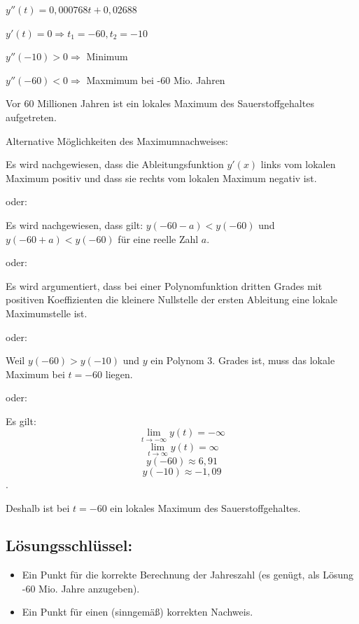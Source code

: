\begin{langesbeispiel}
{\begin{enumerate}
			$y''(t)=0,000768t+0,02688$\leer
			
			$y'(t)=0 \Rightarrow t_1=-60, t_2=-10$
			
			$y''(-10)>0 \Rightarrow$ Minimum
			
			$y''(-60)<0 \Rightarrow$ Maxmimum bei -60 Mio. Jahren
			
			Vor 60 Millionen Jahren ist ein lokales Maximum des Sauerstoffgehaltes aufgetreten.\leer
			
			Alternative Möglichkeiten des Maximumnachweises:\leer
			
			Es wird nachgewiesen, dass die Ableitungsfunktion $y'(x)$ links vom lokalen Maximum positiv und dass sie rechts vom lokalen Maximum negativ ist.\leer
			
			oder:\leer
			
			Es wird nachgewiesen, dass gilt: $y(-60-a)<y(-60)$ und $y(-60+a)<y(-60)$ für eine reelle Zahl $a$.\leer
			
			oder:\leer
		
		Es wird argumentiert, dass bei einer Polynomfunktion dritten Grades mit positiven Koeffizienten die kleinere Nullstelle der ersten Ableitung eine lokale Maximumstelle ist.\leer
		
		oder:\leer
		
		Weil $y(-60)>y(-10)$ und $y$ ein Polynom 3. Grades ist, muss das lokale Maximum bei $t=-60$ liegen.\leer
		
		oder:\leer
		
		Es gilt: $$\lim_{t \to -\infty} y(t)=-\infty$$ $$\lim_{t \to \infty} y(t)=\infty$$ $$y(-60)\approx 6,91$$$$ y(-10)\approx -1,09$$.
		
		Deshalb ist bei $t=-60$ ein lokales Maximum des Sauerstoffgehaltes.
	\subsection{Lösungsschlüssel:}
	
\begin{itemize}
	\item   Ein Punkt für die korrekte Berechnung der Jahreszahl (es genügt, als Lösung -60 Mio. Jahre anzugeben).
	\item   Ein Punkt für einen (sinngemäß) korrekten Nachweis.
\end{itemize}
\end{enumerate}}
		\end{langesbeispiel}